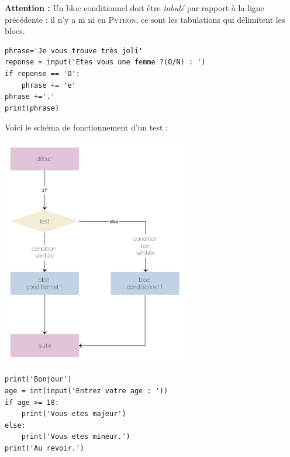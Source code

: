 \textbf{Attention :} Un bloc conditionnel doit être \textit{tabulé} par rapport à la ligne précédente : il n'y a ni   ni 
en \textsc{Python}, ce sont les tabulations qui délimitent les blocs.

\begin{pyc}
	\begin{verbatim}
phrase='Je vous trouve très joli'
reponse = input('Etes vous une femme ?(O/N) : ')
if reponse == 'O':
    phrase += 'e'
phrase +='.'
print(phrase)
\end{verbatim}
\end{pyc}

Voici le schéma de fonctionnement d'un test  :
\begin{center}
	\includegraphics[height=10cm]{img/ifelse}
\end{center}

\begin{pyc}
	\begin{verbatim}
print('Bonjour')
age = int(input('Entrez votre age : '))
if age >= 18:
    print('Vous etes majeur')
else:
    print('Vous etes mineur.')
print('Au revoir.')
\end{verbatim}
\end{pyc}

